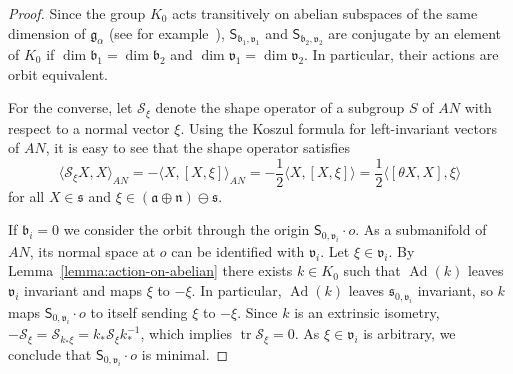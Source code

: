 \documentclass[12pt, a4paper]{amsart}
\newcommand{\g}{\mathfrak}
\newcommand{\s}{\mathsf}
\newcommand{\Ad}{\operatorname{Ad}}
\newcommand{\tr}{\operatorname{tr}}
\theoremstyle{definition}
\begin{document}
\begin{proof}
Since the group $K_0$ acts transitively on abelian subspaces of the same dimension of $\g{g}_\alpha$ 
(see for example~\cite[Lemma~3.2]{DiazLorenzo}),
$\s{S}_{\g{b}_1,\g{v}_1}$ and $\s{S}_{\g{b}_2,\g{v}_2}$ are conjugate by an element of $K_0$ if
$\dim\g{b}_1=\dim\g{b}_2$ and $\dim\g{v}_1=\dim\g{v}_2$.
In particular, their actions are orbit equivalent.

For the converse, let $\mathcal{S}_\xi$ denote the shape operator of a subgroup $S$ of $AN$ 
with respect to a normal vector $\xi$.
Using the Koszul formula for left-invariant vectors of $AN$, it is easy to see that 
the shape operator satisfies
\begin{equation*}
    \langle \mathcal{S}_\xi X, X \rangle_{AN}
    =
    -\langle X,[X,\xi] \rangle_{AN}
    =
    -\frac{1}{2}\langle X,[X,\xi] \rangle
    =
    \frac{1}{2} \langle [\theta X,X],\xi \rangle
\end{equation*}
for all $X\in\g{s}$ and $\xi\in(\g{a}\oplus\g{n})\ominus\g{s}$.

If $\g{b}_i=0$ we consider the orbit through the origin $\s{S}_{0,\g{v}_i}\cdot o$.
As a submanifold of $AN$, its normal space at $o$ can be identified with $\g{v}_i$.
Let $\xi\in\g{v}_i$.
By Lemma~\ref{lemma:action-on-abelian} there exists $k\in K_0$ such that $\Ad(k)$ leaves $\g{v}_i$ invariant 
and maps $\xi$ to $-\xi$.
In particular, $\Ad(k)$ leaves $\g{s}_{0,\g{v}_i}$ invariant, 
so $k$ maps $\s{S}_{0,\g{v}_i}\cdot o$ to itself
sending $\xi$ to $-\xi$.
Since $k$ is an extrinsic isometry, 
$-\mathcal{S}_\xi=\mathcal{S}_{k_*\xi}=k_*\mathcal{S}_\xi k_*^{-1}$,
which implies $\tr\mathcal{S}_\xi=0$.
As $\xi\in\g{v}_i$ is arbitrary,
we conclude that $\s{S}_{0,\g{v}_i}\cdot o$ is minimal.


\end{proof}
\end{document}
